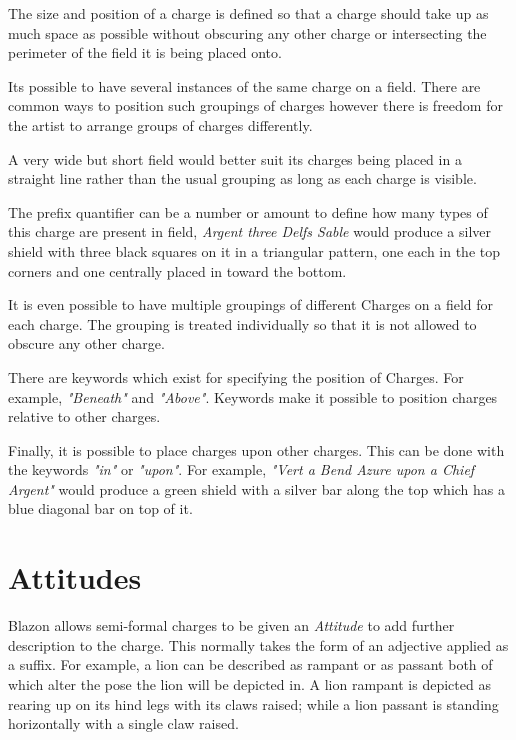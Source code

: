 The size and position of a charge is defined so that a charge should take up as much space as possible without obscuring any other charge or intersecting the perimeter of the field it is being placed onto.  

Its possible to have several instances of the same charge on a field. There are common ways to position such groupings of charges however there is freedom for the artist to arrange groups of charges differently.

A very wide but short field would better suit its charges being placed in a straight line rather than the usual grouping as long as each charge is visible. 


The prefix quantifier can be a number or amount to define how many types of this charge are present in field, \emph{Argent three Delfs Sable} would produce a silver shield with three black squares on it in a triangular pattern, one each in the  top corners and one centrally placed in toward the bottom. 

It is even possible to have multiple groupings of different Charges on a field for each charge. The grouping is treated individually so that it is not allowed to obscure any other charge.  

There are keywords which exist for specifying the position of Charges. For example,  \emph{"Beneath"} and \emph{"Above"}.  Keywords make it possible to position charges relative to other charges.

Finally, it is possible to place charges upon other charges.  This can be done with the keywords \emph{"in"} or \emph{"upon"}. For example, \emph{"Vert a Bend Azure upon a Chief Argent"} would produce a green shield with a silver bar along the top which has a blue diagonal bar on top of it.

\section{Attitudes}
Blazon allows semi-formal charges to be given an \emph{Attitude} to add further description to the charge.  This normally takes the form of an adjective applied as a suffix.  For example, a lion can be described as rampant or as passant both of which alter the pose the lion will be depicted in.  A lion rampant is depicted as rearing up on its hind legs with its claws raised; while a lion passant is standing horizontally with a single claw raised. 



